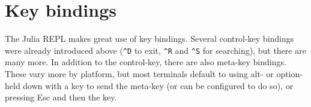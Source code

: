 \hypertarget{11229238099061625177}{}


\section{Key bindings}



The Julia REPL makes great use of key bindings. Several control-key bindings were already introduced above (\texttt{{\textasciicircum}D} to exit, \texttt{{\textasciicircum}R} and \texttt{{\textasciicircum}S} for searching), but there are many more. In addition to the control-key, there are also meta-key bindings. These vary more by platform, but most terminals default to using alt- or option- held down with a key to send the meta-key (or can be configured to do so), or pressing Esc and then the key.





